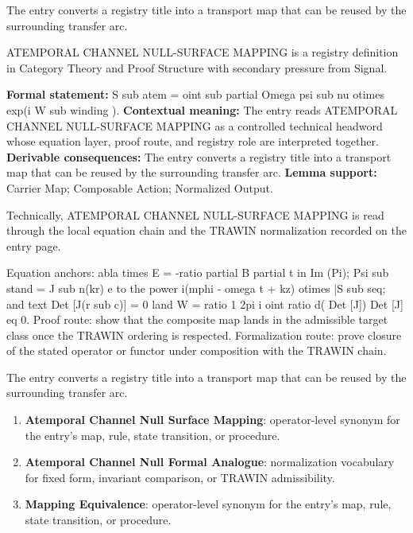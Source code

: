 The entry converts a registry title into a transport map that can be reused by the surrounding transfer arc.
\clearpage


\begingroup\small
{}
ATEMPORAL CHANNEL NULL-SURFACE MAPPING is a registry definition in Category Theory and Proof Structure with secondary pressure from Signal.

\begingroup\footnotesize\setlength{\emergencystretch}{3em}\sloppy
\textbf{Formal statement:} S sub atem = oint sub partial Omega psi sub nu otimes exp(i W sub winding ). \textbf{Contextual meaning:} The entry reads ATEMPORAL CHANNEL NULL-SURFACE MAPPING as a controlled technical headword whose equation layer, proof route, and registry role are interpreted together. \textbf{Derivable consequences:} The entry converts a registry title into a transport map that can be reused by the surrounding transfer arc. \textbf{Lemma support:} Carrier Map; Composable Action; Normalized Output.\par
\endgroup

Technically, ATEMPORAL CHANNEL NULL-SURFACE MAPPING is read through the local equation chain and the TRAWIN normalization recorded on the entry page.

Equation anchors: abla times E = -ratio partial B partial t in Im (Pi); Psi sub stand = J sub n(kr) e to the power i(mphi - omega t + kz) otimes |S sub seq; and text Det [J(r sub c)] = 0 land W = ratio 1 2pi i oint ratio d( Det [J]) Det [J] eq 0. Proof route: show that the composite map lands in the admissible target class once the TRAWIN ordering is respected. Formalization route: prove closure of the stated operator or functor under composition with the TRAWIN chain.

The entry converts a registry title into a transport map that can be reused by the surrounding transfer arc.
\endgroup

\begin{enumerate}[leftmargin=1.6em,itemsep=6pt,topsep=4pt]
\item \textbf{Atemporal Channel Null Surface Mapping}: operator-level synonym for the entry's map, rule, state transition, or procedure.
\item \textbf{Atemporal Channel Null Formal Analogue}: normalization vocabulary for fixed form, invariant comparison, or TRAWIN admissibility.
\item \textbf{Mapping Equivalence}: operator-level synonym for the entry's map, rule, state transition, or procedure.
\end{enumerate}

